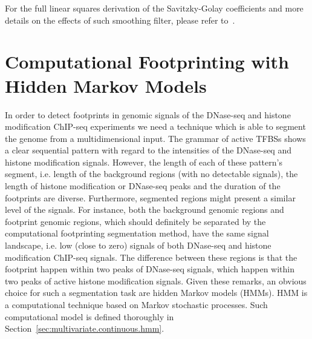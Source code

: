 For the full linear squares derivation of the Savitzky-Golay coefficients and more details on the effects of such smoothing filter, please refer to~\cite{luo2005}.

\section{Computational Footprinting with Hidden Markov Models}
\label{sec:computational.footprinting.hmm}

In order to detect footprints in genomic signals of the DNase-seq and histone modification ChIP-seq experiments we need a technique which is able to segment the genome from a multidimensional input. The grammar of active TFBSs shows a clear sequential pattern with regard to the intensities of the DNase-seq and histone modification signals. However, the length of each of these pattern's segment, i.e. length of the background regions (with no detectable signals), the length of histone modification or DNase-seq peaks and the duration of the footprints are diverse. Furthermore, segmented regions might present a similar level of the signals. For instance, both the background genomic regions and footprint genomic regions, which should definitely be separated by the computational footprinting segmentation method, have the same signal landscape, i.e. low (close to zero) signals of both DNase-seq and histone modification ChIP-seq signals. The difference between these regions is that the footprint happen within two peaks of DNase-seq signals, which happen within two peaks of active histone modification signals. Given these remarks, an obvious choice for such a segmentation task are hidden Markov models (HMMs). HMM is a computational technique based on Markov stochastic processes. Such computational model is defined thoroughly in Section~\ref{sec:multivariate.continuous.hmm}.

